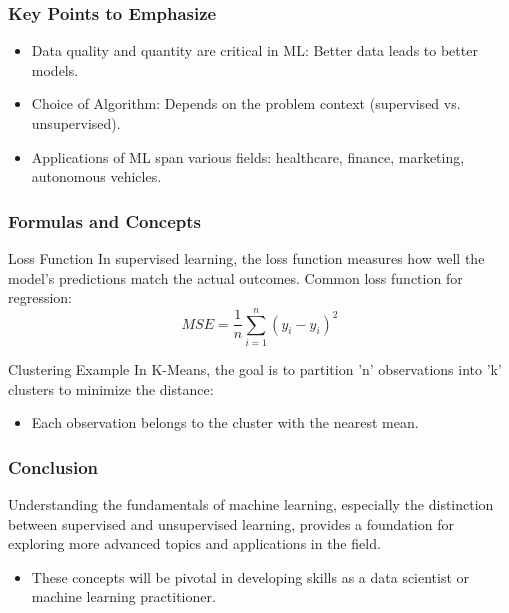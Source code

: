 \documentclass[aspectratio=169]{beamer}
\begin{document}
\begin{frame}[fragile]
\end{frame}

\begin{frame}[fragile]
    \frametitle{Key Points to Emphasize}
    
    \begin{itemize}
        \item Data quality and quantity are critical in ML: Better data leads to better models.
        \item Choice of Algorithm: Depends on the problem context (supervised vs. unsupervised).
        \item Applications of ML span various fields: healthcare, finance, marketing, autonomous vehicles.
    \end{itemize}
    
\end{frame}

\begin{frame}[fragile]
    \frametitle{Formulas and Concepts}

    \begin{block}{Loss Function}
        In supervised learning, the loss function measures how well the model's predictions match the actual outcomes. 
        Common loss function for regression:
        \begin{equation}
            MSE = \frac{1}{n} \sum_{i=1}^{n} (y_i - \hat{y}_i)^2
        \end{equation}
    \end{block}
    
    \begin{block}{Clustering Example}
        In K-Means, the goal is to partition 'n' observations into 'k' clusters to minimize the distance:
        \begin{itemize}
            \item Each observation belongs to the cluster with the nearest mean.
        \end{itemize}
    \end{block}
    
\end{frame}

\begin{frame}[fragile]
    \frametitle{Conclusion}

    Understanding the fundamentals of machine learning, especially the distinction between supervised and unsupervised learning, provides a foundation for exploring more advanced topics and applications in the field. 

    \begin{itemize}
        \item These concepts will be pivotal in developing skills as a data scientist or machine learning practitioner.
    \end{itemize}

\end{frame}
\end{document}
